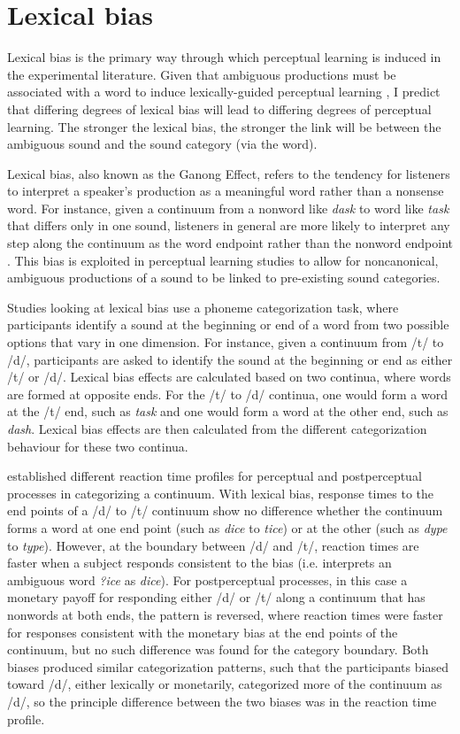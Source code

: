 \section{Lexical bias}
\label{sec:lexicalbias}

Lexical bias is the primary way through which perceptual learning is induced in the experimental literature.  Given that ambiguous productions must be associated with a word to induce lexically-guided perceptual learning \citep{Norris2003}, I predict that differing degrees of lexical bias will lead to differing degrees of perceptual learning.  The stronger the lexical bias, the stronger the link will be between the ambiguous sound and the sound category (via the word).


Lexical bias, also known as the Ganong Effect, refers to the tendency for listeners to interpret a speaker's production as a meaningful word rather than a nonsense word.  
For instance, given a continuum from a nonword like \emph{dask} to word like \emph{task} that differs only in one sound, listeners in general are more likely to interpret any step along the continuum as the word endpoint rather than the nonword endpoint \citep{Ganong1980}. 
This bias is exploited in perceptual learning studies to allow for noncanonical, ambiguous productions of a sound to be linked to pre-existing sound categories.

Studies looking at lexical bias use a phoneme categorization task, where participants identify a sound at the beginning or end of a word from two possible options that vary in one dimension.  
For instance, given a continuum from /t/ to /d/, participants are asked to identify the sound at the beginning or end as either /t/ or /d/. 
Lexical bias effects are calculated based on two continua, where words are formed at opposite ends. 
For the /t/ to /d/ continua, one would form a word at the /t/ end, such as \emph{task} and one would form a word at the other end, such as \emph{dash}.  
Lexical bias effects are then calculated from the different categorization behaviour for these two continua.

\citet{Connine1987a} established different reaction time profiles for perceptual and postperceptual processes in categorizing a continuum.  With lexical bias, response times to the end points of a /d/ to /t/ continuum show no difference whether the continuum forms a word at one end point (such as \emph{dice} to \emph{tice}) or at the other (such as \emph{dype} to \emph{type}).  However, at the boundary between /d/ and /t/, reaction times are faster when a subject responds consistent to the bias (i.e. interprets an ambiguous word \emph{?ice} as \emph{dice}).  For postperceptual processes, in this case a monetary payoff for responding either /d/ or /t/ along a continuum that has nonwords at both ends, the pattern is reversed, where reaction times were faster for responses consistent with the monetary bias at the end points of the continuum, but no such difference was found for the category boundary.  Both biases produced similar categorization patterns, such that the participants biased toward /d/, either lexically or monetarily, categorized more of the continuum as /d/, so the principle difference between the two biases was in the reaction time profile.

